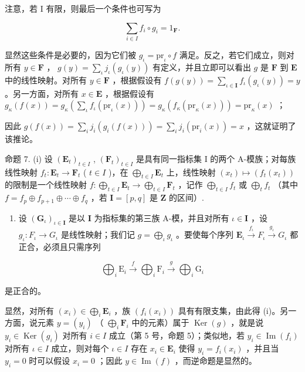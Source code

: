 注意，若 I 有限，则最后一个条件也可写为

\[
\sum_ {i \in I} f _ {i} \circ g _ {i} = 1 _ {\mathbf {F}}.\tag{24}
\]

显然这些条件是必要的，因为它们被 \(g_{\iota} = \mathrm{pr}_{\iota} \circ f\) 满足。反之，若它们成立，则对所有 \(y \in \mathbf{F}\) ， \(g(y) = \sum_{\iota} j_{\iota}(g_{\iota}(y))\) 有定义，并且立即可以看出 \(g\) 是 \(\mathbf{F}\) 到 \(\mathbf{E}\) 中的线性映射。对所有 \(y \in \mathbf{F}\) ，根据假设有 \(f(g(y)) = \sum_{\iota \in \mathbf{I}} f_{\iota}(g_{\iota}(y)) = y\) 。另一方面，对所有 \(x \in \mathbf{E}\) ，根据假设有 \(g_{\kappa}(f(x)) = g_{\kappa}\left(\sum_{\iota} f_{\iota}(\mathrm{pr}_{\iota}(x))\right) = g_{\kappa}(f_{\kappa}(\mathrm{pr}_{\kappa}(x))) = \mathrm{pr}_{\kappa}(x)\) ；

因此 \(g(f(x)) = \sum_{i} j_i(g_i(f(x))) = \sum_{i} j_i(\mathrm{pr}_i(x)) = x\) ，这就证明了该推论。

命题 7. (i) 设 \((\mathbf{E}_t)_{t \in I}\) , \((\mathbf{F}_t)_{t \in I}\) 是具有同一指标集 I 的两个 A-模族；对每族线性映射 \(f_t: \mathbf{E}_t \to \mathbf{F}_t\) ( \(t \in I\) )，在 \(\bigoplus_{t \in I} \mathbf{E}_t\) 上，线性映射 \((x_t) \mapsto (f_t(x_t))\) 的限制是一个线性映射 \(f: \bigoplus_{t \in I} \mathbf{E}_t \to \bigoplus_{t \in I} \mathbf{F}_t\) ，记作 \(\bigoplus_{t \in I} f_t\) 或 \(\bigoplus_{t} f_t\) （其中 \(f = f_p \oplus f_{p+1} \oplus \cdots \oplus f_q\) ，若 \(\mathbf{I} = [p, q]\) 是 \(\mathbf{Z}\) 的区间）.

\begin{enumerate}
\def\labelenumi{(\roman{enumi})}
\setcounter{enumi}{1}
\tightlist
\item
  设 \((\mathbf{G}_{\iota})_{\iota \in \mathbf{I}}\) 是以 \(\mathbf{I}\) 为指标集的第三族 A-模，并且对所有 \(\iota \in \mathbf{I}\) ，设 \(g_{\iota}: F_{\iota} \to G_{\iota}\) 是线性映射；我们记 \(g = \bigoplus_{\iota} g_{\iota}\) 。要使每个序列 \(\mathbf{E}_{\iota} \xrightarrow{f_{\iota}} F_{\iota} \xrightarrow{g_{\iota}} G_{\iota}\) 都正合，必须且只需序列
\end{enumerate}

\[
\bigoplus_ {i} \mathrm{E} _ {i} \xrightarrow {f} \bigoplus_ {i} \mathrm{F} _ {i} \xrightarrow {g} \bigoplus_ {i} \mathrm{G} _ {i}
\]

是正合的。

显然，对所有 \((x_{i})\in \bigoplus_{i}\mathbf{E}_{i}\) ，族 \((f_{i}(x_{i}))\) 具有有限支集，由此得 (i)。另一方面，说元素 \(y = (y_{i})\) （ \(\bigoplus_{i}\mathbf{F}_{i}\) 中的元素）属于 \(\operatorname {Ker}(g)\) ，就是说 \(y_{i}\in \operatorname {Ker}(g_{i})\) 对所有 \(i \in I\) 成立（第 5 号，命题 5）；类似地，若 \(y_{i}\in \operatorname {Im}(f_{i})\) 对所有 \(\iota \in I\) 成立，则对每个 \(\iota \in I\) 存在 \(x_{i}\in \mathbf{E}_{i}\) 使得 \(y_{i} = f_{i}(x_{i})\) ，并且当 \(y_{i} = 0\) 时可以假设 \(x_{i} = 0\) ；因此 \(y\in \operatorname {Im}(f)\) ，而逆命题是显然的。

